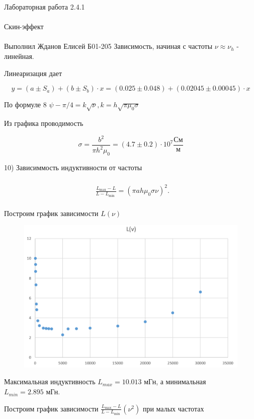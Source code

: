 \documentclass{astroedu-lab}
\begin{document}
\begin{problem}{\huge Лабораторная работа 2.4.1\\\\Скин-эффект\\\\Выполнил Жданов Елисей Б01-205}
Зависимость, начиная с частоты $\nu \approx \nu_h$ - линейная.

Линеаризация дает

\begin{equation}
	y = (a \pm S_a) + (b \pm S_b) \cdot x = (0.025 \pm 0.048) + (0.02045 \pm 0.00045) \cdot x
\end{equation}

По формуле 8 $\psi - \pi/4 = k \sqrt{\nu}, k = h \sqrt{\pi \mu_0 \sigma}$

Из графика проводимость 

\begin{equation}
	\sigma = \frac{b^2}{\pi h^2 \mu_0} = (4.7 \pm 0.2) \cdot 10^7 \frac{\text{См}}{\text{м}}
\end{equation}

10) Зависиммость индуктивности от частоты

$$
\begin{aligned}
&  \\
& \frac{L_{\max }-L}{L-L_{\text {min }}}=\left(\pi a h \mu_0 \sigma \nu\right)^2 \text {. } \\
& 
\end{aligned}
$$

Построим график зависимости $L(\nu)$

\begin{figure}[!h]
	\centering
	\includegraphics[width=1\textwidth]{гр5.png}
	\label{fig:boiler}
\end{figure}

Максимальная индуктивность $L_{max} = 10.013
 \text{ мГн}$, а минимальная $L_{min} = 2.895 \text{ мГн}$. 

Построим график зависимости $\frac{L_{\max }-L}{L-L_{\text {min }}}(\nu^2)$ при малых частотах


\end{problem}
\end{document}
